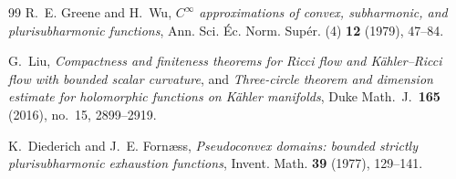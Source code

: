\documentclass[12pt,a4paper]{amsart}
\theoremstyle{definition}
\theoremstyle{remark}
\begin{document}
\begin{thebibliography}{99}
R.~E. Greene and H.~Wu,
\textit{$C^\infty$ approximations of convex, subharmonic, and plurisubharmonic
functions},
Ann. Sci. Éc. Norm. Supér. (4) \textbf{12} (1979), 47--84.

G.~Liu,
\textit{Compactness and finiteness theorems for Ricci flow and K\"ahler--Ricci flow with bounded scalar curvature},
and
\textit{Three-circle theorem and dimension estimate for holomorphic functions on K\"ahler manifolds},
Duke Math.\ J.\ \textbf{165} (2016), no.~15, 2899--2919.

K.~Diederich and J.~E. Fornæss,
\textit{Pseudoconvex domains: bounded strictly plurisubharmonic exhaustion
functions},
Invent. Math. \textbf{39} (1977), 129--141.

\end{thebibliography}
\end{document}
